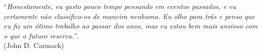\thispagestyle{empty}
\begin{center}
%
\end{center}
\vspace{18cm}

\begin{flushright}
``\emph{Honestamente, eu gasto pouco tempo pensando em eventos passados, e eu
certamente não classifico-os de maneira nenhuma. Eu olho para trás e
penso que eu fiz um ótimo trabalho ao passar dos anos, mas eu estou
bem mais ansioso com o que o futuro reserva.}''.  \\ (John D. Carmack)
\end{flushright}
